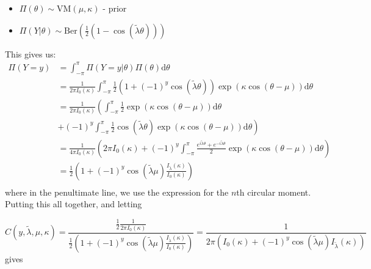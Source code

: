 \documentclass[]{report}
\begin{document}
\begin{itemize}
	\item $\Pi(\theta) \sim \text{VM}(\mu, \kappa)$ - prior
	\item $\Pi(Y | \theta) \sim \text{Ber}(\frac{1}{2}(1 - \cos(\tilde{\lambda} \theta)))$
\end{itemize}

This gives us:
\begin{align*}
	\Pi(Y = y) &= \int_{-\pi}^{\pi} \Pi(Y = y | \theta) \Pi\left( \theta \right) \text{d}\theta \\
		   &= \frac{1}{2 \pi I_0(\kappa)} \int_{- \pi}^{\pi} \frac{1}{2} (1 + (-1)^y \cos(\tilde{\lambda} \theta)) \exp(\kappa \cos(\theta - \mu)) \text{d} \theta \\
	&= \frac{1}{2 \pi I_0(\kappa)} \left( \int_{- \pi}^{\pi} \frac{1}{2} \exp(\kappa \cos(\theta - \mu)) \text{d} \theta \right. \\
	 &\left. + (-1)^y \int_{- \pi}^{\pi} \frac{1}{2} \cos(\tilde{\lambda} \theta) \exp(\kappa \cos(\theta - \mu)) \text{d} \theta  \right) \\
	 &= \frac{1}{4 \pi I_0\left( \kappa \right) }\left( 2\pi I_0\left( \kappa \right)  + (-1)^{y} \int_{-\pi}^{\pi}\frac{e^{i \tilde{\lambda} \theta} + e^{-i \tilde{\lambda} \theta}}{2}\exp\left( \kappa \cos \left( \theta - \mu \right)  \right) \text{d}\theta \right) \\
	&= \frac{1}{2}\left(1 + (-1)^y \cos(\tilde{\lambda} \mu) \frac{I_{\tilde{\lambda}}(\kappa)}{I_0(\kappa)}\right)  \\
\end{align*}
where in the penultimate line, we use the expression for the $n$th circular moment.
Putting this all together, and letting

\[
C(y, \tilde{\lambda}, \mu, \kappa) = \frac{\frac{1}{2} \frac{1}{2 \pi I_0(\kappa)}}{\frac{1}{2} (1 + (-1)^y \cos(\tilde{\lambda} \mu) \frac{I_{\tilde{\lambda}}(\kappa)}{I_0(\kappa)} )} = \frac{1}{ 2 \pi(I_0(\kappa) + (-1)^y \cos(\tilde{\lambda} \mu) I_{\tilde{\lambda}}(\kappa))}
\]
gives
\end{document}
